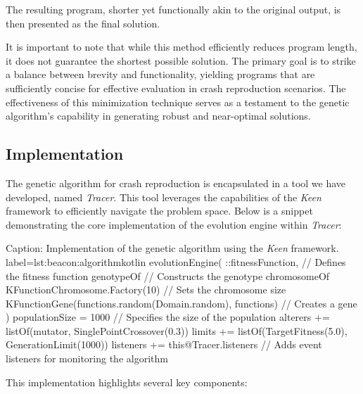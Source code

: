         The resulting program, shorter yet functionally akin to the original output, is then presented as the final 
        solution.
    
        It is important to note that while this method efficiently reduces program length, it does not guarantee the 
        shortest possible solution. The primary goal is to strike a balance between brevity and functionality, yielding 
        programs that are sufficiently concise for effective evaluation in crash reproduction scenarios. The 
        effectiveness of this minimization technique serves as a testament to the genetic algorithm's capability in 
        generating robust and near-optimal solutions.
    
    \subsection{Implementation}
        The genetic algorithm for crash reproduction is encapsulated in a tool we have developed, named 
        \textit{Tracer}. This tool leverages the capabilities of the \textit{Keen} framework to efficiently navigate 
        the problem space. Below is a snippet demonstrating the core implementation of the evolution engine within 
        \textit{Tracer}:
    
        \begin{code}{%
            Caption: Implementation of the genetic algorithm using the \textit{Keen} framework.
        }{label=lst:beacon:algorithm}{kotlin}
            evolutionEngine(
                ::fitnessFunction, // Defines the fitness function
                genotypeOf { // Constructs the genotype
                    chromosomeOf {
                        KFunctionChromosome.Factory(10) { // Sets the chromosome size
                            KFunctionGene(functions.random(Domain.random), functions) // Creates a gene
                        }
                    }
                }
            ) {
                populationSize = 1000 // Specifies the size of the population
                alterers += listOf(mutator, SinglePointCrossover(0.3))
                limits += listOf(TargetFitness(5.0), GenerationLimit(1000))
                listeners += this@Tracer.listeners // Adds event listeners for monitoring the algorithm
            }
        \end{code}
    
        This implementation highlights several key components:


